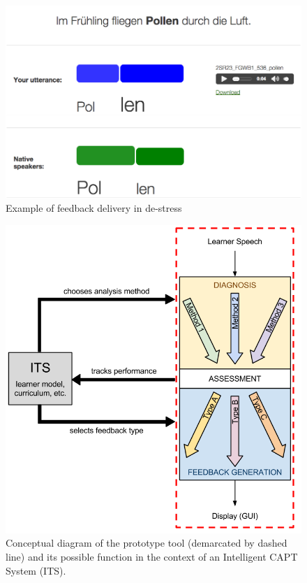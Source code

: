 \documentclass[a4paper]{article}
\begin{document}
	\begin{figure}[h!]
		\centering
		\includegraphics[width=\columnwidth]{../../img/screenshots/graphicalFB-weka-plusTextStyle}
		\caption{Example of feedback delivery in de-stress}
		\label{fig:interface:student}
	\end{figure}
	
	\begin{figure}[!h] 
		\centering
		\includegraphics[height=.25\textheight]{../../img/hourglass-ITS} 
		\caption[Conceptual diagram of the prototype lexical stress CAPT tool]{Conceptual diagram of the prototype 
		tool 
		(demarcated by dashed line) 
		and its possible function in the context of an Intelligent CAPT System (ITS).}
		\label{fig:hourglass-ITS}
	\end{figure}
	
\end{document}
